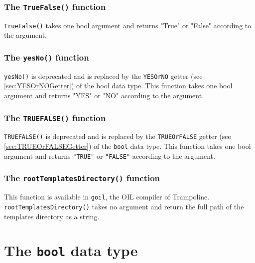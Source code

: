 \documentclass[10pt,openright,twosides,final]{memoir}
\newcommand{\gtltype}[1]{{\small\ttfamily #1}}
\newcommand{\scst}[1]{{\footnotesize\ttfamily\colorbox{light-blue}{"#1"}}}
\newcommand{\gtlinline}[1]{\colorbox{light-blue}{\lstinline[language=gtl]{#1}}}
\begin{document}
\subsubsection{The \texttt{TrueFalse()} function}

\gtlinline{TrueFalse()} takes one bool argument and returns \scst{True} or \scst{False} according to the argument.

\subsubsection{The \texttt{yesNo()} function}

\gtlinline{yesNo()} is deprecated and is replaced by the \gtlinline{YESOrNO} getter (see \ref{sec:YESOrNOGetter}) of the \gtltype{bool} data type. This function takes one bool argument and returns \scst{YES} or \scst{NO} according to the argument.

\subsubsection{The \texttt{TRUEFALSE()} function}

\gtlinline{TRUEFALSE()} is deprecated and is replaced by the \texttt{TRUEOrFALSE} getter (see \ref{sec:TRUEOrFALSEGetter})  of the \texttt{bool} data type. This function takes one bool argument and returns \texttt{"TRUE"} or \texttt{"FALSE"} according to the argument.

\subsubsection{The \texttt{rootTemplatesDirectory()} function}

This function is available in \texttt{goil}, the OIL compiler of Trampoline. \gtlinline{rootTemplatesDirectory()} takes no argument and return the full path of the templates directory as a string.



\section{The \texttt{bool} data type}
\end{document}

